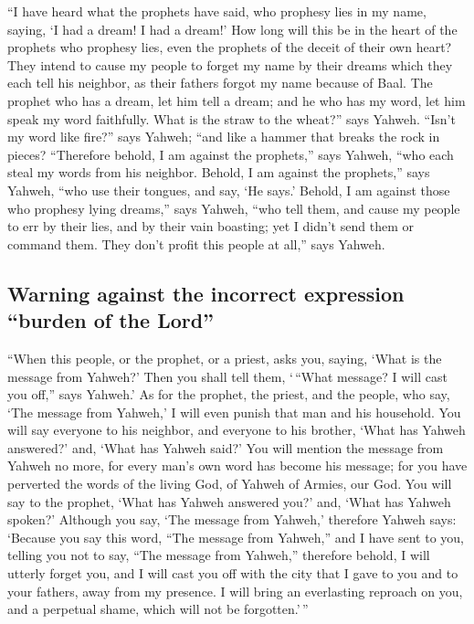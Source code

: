  ``I have heard what the prophets have said, who prophesy
lies in my name, saying, `I had a dream! I had a dream!' 
How long will this be in the heart of the prophets who prophesy lies,
even the prophets of the deceit of their own heart?  They
intend to cause my people to forget my name by their dreams which they
each tell his neighbor, as their fathers forgot my name because of Baal.
 The prophet who has a dream, let him tell a dream; and
he who has my word, let him speak my word faithfully. What is the straw
to the wheat?'' says Yahweh.  ``Isn't my word like
fire?'' says Yahweh; ``and like a hammer that breaks the rock in pieces?
 ``Therefore behold, I am against the prophets,'' says
Yahweh, ``who each steal my words from his neighbor. 
Behold, I am against the prophets,'' says Yahweh, ``who use their
tongues, and say, `He says.'  Behold, I am against those
who prophesy lying dreams,'' says Yahweh, ``who tell them, and cause my
people to err by their lies, and by their vain boasting; yet I didn't
send them or command them. They don't profit this people at all,'' says
Yahweh.

\hypertarget{warning-against-the-incorrect-expression-burden-of-the-lord}{%
\subsection{Warning against the incorrect expression ``burden of the
Lord''}\label{warning-against-the-incorrect-expression-burden-of-the-lord}}

 ``When this people, or the prophet, or a priest, asks
you, saying, `What is the message from Yahweh?' Then you shall tell
them, `\,``What message? I will cast you off,'' says Yahweh.'
 As for the prophet, the priest, and the people, who say,
`The message from Yahweh,' I will even punish that man and his
household.  You will say everyone to his neighbor, and
everyone to his brother, `What has Yahweh answered?' and, `What has
Yahweh said?'  You will mention the message from Yahweh
no more, for every man's own word has become his message; for you have
perverted the words of the living God, of Yahweh of Armies, our God.
 You will say to the prophet, `What has Yahweh answered
you?' and, `What has Yahweh spoken?'  Although you say,
`The message from Yahweh,' therefore Yahweh says: `Because you say this
word, ``The message from Yahweh,'' and I have sent to you, telling you
not to say, ``The message from Yahweh,''  therefore
behold, I will utterly forget you, and I will cast you off with the city
that I gave to you and to your fathers, away from my presence.
 I will bring an everlasting reproach on you, and a
perpetual shame, which will not be forgotten.'\,''

